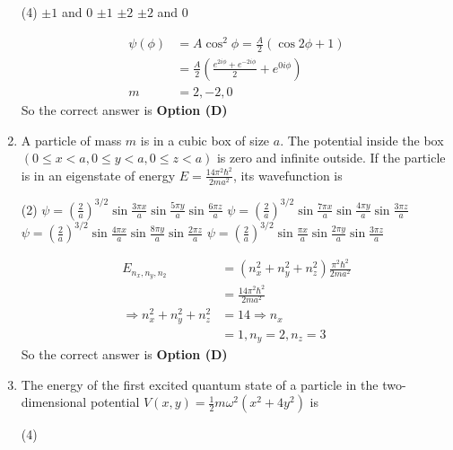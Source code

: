 \begin{enumerate}
{}
\begin{tasks}(4)
\task[\textbf{A.}] $\pm 1$ and 0
\task[\textbf{B.}] $\pm 1$
\task[\textbf{C.}] $\pm 2$
\task[\textbf{D.}] $\pm 2$ and 0
\end{tasks}
\begin{answer}
\begin{align*}
\psi(\phi)&=A \cos ^{2} \phi=\frac{A}{2}(\cos 2 \phi+1)\\
&=\frac{A}{2}\left(\frac{e^{2 i \phi}+e^{-2 i \phi}}{2}+e^{0 i \phi}\right)\\
m&=2,-2,0
\end{align*}
So the correct answer is \textbf{Option (D)}
\end{answer}
	\item A particle of mass $m$ is in a cubic box of size $a$. The potential inside the box $(0 \leq x<a, 0 \leq y<a, 0 \leq z<a)$ is zero and infinite outside. If the particle is in an eigenstate of energy $E=\frac{14 \pi^{2} \hbar^{2}}{2 m a^{2}}$, its wavefunction is
{	}
\begin{tasks}(2)
\task[\textbf{A.}]  $\psi=\left(\frac{2}{a}\right)^{3 / 2} \sin \frac{3 \pi x}{a} \sin \frac{5 \pi y}{a} \sin \frac{6 \pi z}{a}$
\task[\textbf{B.}]  $\psi=\left(\frac{2}{a}\right)^{3 / 2} \sin \frac{7 \pi x}{a} \sin \frac{4 \pi y}{a} \sin \frac{3 \pi z}{a}$
\task[\textbf{C.}] $\psi=\left(\frac{2}{a}\right)^{3 / 2} \sin \frac{4 \pi x}{a} \sin \frac{8 \pi y}{a} \sin \frac{2 \pi z}{a}$
\task[\textbf{D.}] $\psi=\left(\frac{2}{a}\right)^{3 / 2} \sin \frac{\pi x}{a} \sin \frac{2 \pi y}{a} \sin \frac{3 \pi z}{a}$
\end{tasks}
\begin{answer}
\begin{align*}
E_{n_{x}, n_{y}, n_{2}}&=\left(n_{x}^{2}+n_{y}^{2}+n_{z}^{2}\right) \frac{\pi^{2} \hbar^{2}}{2 m a^{2}}\\&=\frac{14 \pi^{2} \hbar^{2}}{2 m a^{2}}\\
\Rightarrow n_{x}^{2}+n_{y}^{2}+n_{z}^{2}&=14 \Rightarrow n_{x}\\&=1, n_{y}=2, n_{z}=3
\end{align*}
So the correct answer is \textbf{Option (D)}
\end{answer}
	\item The energy of the first excited quantum state of a particle in the two-dimensional potential $V(x, y)=\frac{1}{2} m \omega^{2}\left(x^{2}+4 y^{2}\right)$ is
{	}
\begin{tasks}(4)

\end{tasks}
\end{enumerate}
